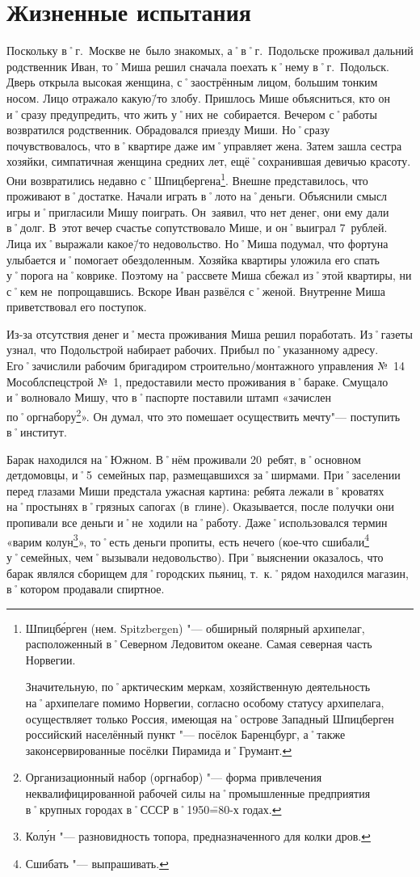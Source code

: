 ﻿\chapter{Жизненные испытания}

Поскольку в˚г.~Москве не~было знакомых, а˚в˚г.~Подольске проживал дальний родственник Иван, то˚Миша решил сначала поехать к˚нему в˚г.~Подольск. Дверь открыла высокая женщина, с˚заострённым лицом, большим тонким носом. Лицо отражало какую\=/то злобу. Пришлось Мише объясниться, кто он и˚сразу предупредить, что жить у˚них не~собирается. Вечером с˚работы возвратился родственник. Обрадовался приезду Миши. Но˚сразу почувствовалось, что в˚квартире даже им˚управляет жена. Затем зашла сестра хозяйки, симпатичная женщина средних лет, ещё˚сохранившая девичью красоту. Они возвратились недавно с˚Шпицбергена\footnote{Шпицб\'{е}рген (нем. Spitzbergen) "--- обширный полярный архипелаг, расположенный в˚Северном Ледовитом океане. Самая северная часть Норвегии. 

Значительную, по˚арктическим меркам, хозяйственную деятельность на˚архипелаге помимо Норвегии, согласно особому статусу архипелага, осуществляет только Россия, имеющая на˚острове Западный Шпицберген российский населённый пункт "--- посёлок Баренцбург, а˚также законсервированные посёлки Пирамида и˚Грумант.}. 
Внешне представилось, что проживают в˚достатке. Начали играть в˚лото на˚деньги. Объяснили смысл игры и˚пригласили Мишу поиграть. Он~заявил, что нет денег, они ему дали в˚долг. В~этот вечер счастье сопутствовало Мише, и он˚выиграл 7~рублей. Лица их˚выражали какое\=/то недовольство. Но˚Миша подумал, что фортуна улыбается и˚помогает обездоленным. Хозяйка квартиры уложила его спать у˚порога на˚коврике. Поэтому на˚рассвете Миша сбежал из˚этой квартиры, ни с˚кем не~попрощавшись. Вскоре Иван развёлся с˚женой. Внутренне Миша приветствовал его поступок.

Из-за отсутствия денег и˚места проживания Миша решил поработать. Из˚газеты узнал, что Подольстрой набирает рабочих. Прибыл по˚указанному адресу. Его˚зачислили рабочим бригадиром строительно\-/монтажного управления №~14 Мособлспецстрой №~1, предоставили место проживания в˚бараке. Смущало и˚волновало Мишу, что в˚паспорте поставили штамп «зачислен по˚оргнабору\footnote{Организационный набор (оргнабор) "--- форма привлечения неквалифицированной рабочей силы на˚промышленные предприятия в˚крупных городах в˚СССР в˚1950\==80-х годах.}». Он думал, что это помешает осуществить мечту"--- поступить в˚институт.

Барак находился на˚Южном. В˚нём проживали 20~ребят, в˚основном детдомовцы, и˚5~семейных пар, размещавшихся за˚ширмами. При˚заселении перед глазами Миши предстала ужасная картина: ребята лежали в˚кроватях на˚простынях в˚грязных сапогах (в~глине). Оказывается, после получки они пропивали все деньги и˚не~ходили на˚работу. Даже˚использовался термин «варим колун\footnote{Кол\'{у}н "--- разновидность топора, предназначенного для колки дров.}», то˚есть деньги пропиты, есть нечего (кое-что сшибали\footnote{Сшибать "--- выпрашивать.} у˚семейных, чем˚вызывали недовольство). При˚выяснении оказалось, что барак являлся сборищем для˚городских пьяниц, т.~к.˚рядом находился магазин, в˚котором продавали спиртное. 


